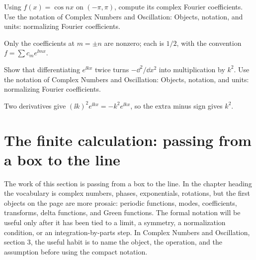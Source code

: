 \begin{exercise}
Using \(f(x)=\cos nx\) on \((-\pi,\pi)\), compute its complex Fourier coefficients.  Use the notation of Complex Numbers and Oscillation: Objects, notation, and units: normalizing Fourier coefficients.
\begin{answer}
Only the coefficients at \(m=\pm n\) are nonzero; each is \(1/2\), with the convention \(f=\sum c_me^{\ii mx}\).
\end{answer}
\end{exercise}

\begin{exercise}
Show that differentiating \(e^{\ii kx}\) twice turns \(-\dd^2/\dd x^2\) into multiplication by \(k^2\).  Use the notation of Complex Numbers and Oscillation: Objects, notation, and units: normalizing Fourier coefficients.
\begin{answer}
Two derivatives give \((\ii k)^2e^{\ii kx}=-k^2e^{\ii kx}\), so the extra minus sign gives \(k^2\).
\end{answer}
\end{exercise}



\section{The finite calculation: passing from a box to the line}













The work of this section is passing from a box to the line.  In the chapter heading the vocabulary is complex numbers, phases, exponentials, rotations, but the first objects on the page are more prosaic: periodic functions, modes, coefficients, transforms, delta functions, and Green functions.  The formal notation will be useful only after it has been tied to a limit, a symmetry, a normalization condition, or an integration-by-parts step.  In Complex Numbers and Oscillation, section 3, the useful habit is to name the object, the operation, and the assumption before using the compact notation.

